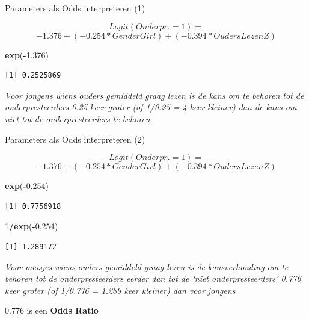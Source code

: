 \documentclass[
  10pt,
  ignorenonframetext,
]{beamer}
\newenvironment{Shaded}{\begin{snugshade}}{\end{snugshade}}
\newcommand{\DecValTok}[1]{\textcolor[rgb]{0.00,0.00,0.81}{#1}}
\newcommand{\FloatTok}[1]{\textcolor[rgb]{0.00,0.00,0.81}{#1}}
\newcommand{\KeywordTok}[1]{\textcolor[rgb]{0.13,0.29,0.53}{\textbf{#1}}}
\newcommand{\NormalTok}[1]{#1}
\newcommand{\OperatorTok}[1]{\textcolor[rgb]{0.81,0.36,0.00}{\textbf{#1}}}
\begin{document}
\begin{frame}[fragile]{Parameters als Odds interpreteren (1)}
\protect\hypertarget{parameters-als-odds-interpreteren-1}{}

\[Logit(Onderpr. = 1 ) = \] \[-1.376 +
  (-0.254*GenderGirl) + (-0.394*OudersLezenZ)  \]

\tiny

\begin{Shaded}
\begin{Highlighting}[]
\KeywordTok{exp}\NormalTok{(}\OperatorTok{-}\FloatTok{1.376}\NormalTok{)}
\end{Highlighting}
\end{Shaded}

\begin{verbatim}
[1] 0.2525869
\end{verbatim}

\normalsize

\emph{Voor jongens wiens ouders gemiddeld graag lezen is de kans om te
behoren tot de onderpresteerders 0.25 keer groter (of 1/0.25 = 4 keer
kleiner) dan de kans om niet tot de onderpresteerders te behoren}

\end{frame}

\begin{frame}[fragile]{Parameters als Odds interpreteren (2)}
\protect\hypertarget{parameters-als-odds-interpreteren-2}{}

\[ Logit(Onderpr. = 1 ) =\]
\[-1.376 + (-0.254*GenderGirl) + (-0.394*OudersLezenZ) \]

\tiny

\begin{Shaded}
\begin{Highlighting}[]
\KeywordTok{exp}\NormalTok{(}\OperatorTok{-}\FloatTok{0.254}\NormalTok{)}
\end{Highlighting}
\end{Shaded}

\begin{verbatim}
[1] 0.7756918
\end{verbatim}

\begin{Shaded}
\begin{Highlighting}[]
\DecValTok{1}\OperatorTok{/}\KeywordTok{exp}\NormalTok{(}\OperatorTok{-}\FloatTok{0.254}\NormalTok{)}
\end{Highlighting}
\end{Shaded}

\begin{verbatim}
[1] 1.289172
\end{verbatim}

\normalsize

\emph{Voor meisjes wiens ouders gemiddeld graag lezen is de
\textcolor{uarood}{kansverhouding} om te behoren tot de
onderpresteerders eerder dan tot de `niet onderpresteerders' 0.776 keer
groter (of 1/0.776 = 1.289 keer kleiner) dan voor jongens}

\bigskip

0.776 is een \textbf{\textcolor{uarood}{Odds Ratio}}

\end{frame}
\end{document}
